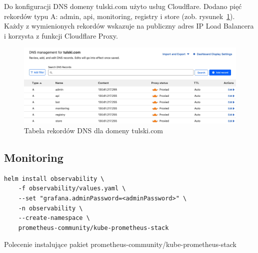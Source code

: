 Do konfiguracji DNS domeny tulski.com użyto usług Cloudflare.
Dodano pięć rekordów typu A: admin, api, monitoring, registry i store (zob. rysunek~\ref{fig:dns-tulski-com}).
Każdy z wymienionych rekordów wskazuje na publiczny adres IP Load Balancera i korzysta z funkcji Cloudflare Proxy.

\begin{figure}[H]
    \centering
    \includegraphics[width=\textwidth]{img/dns-tulski-com}
    \caption{Tabela rekordów DNS dla domeny tulski.com}
    \label{fig:dns-tulski-com}
\end{figure}

\subsection{Monitoring}\label{subsec:monitoring}


\begin{listing}[H]
    \begin{verbatim}
helm install observability \
    -f observability/values.yaml \
    --set "grafana.adminPassword=<adminPassword>" \
    -n observability \
    --create-namespace \
    prometheus-community/kube-prometheus-stack
    \end{verbatim}
    \caption{Polecenie instalujące pakiet prometheus-community/kube-prometheus-stack}
    \label{lst:helm-install-observability}
\end{listing}

%

